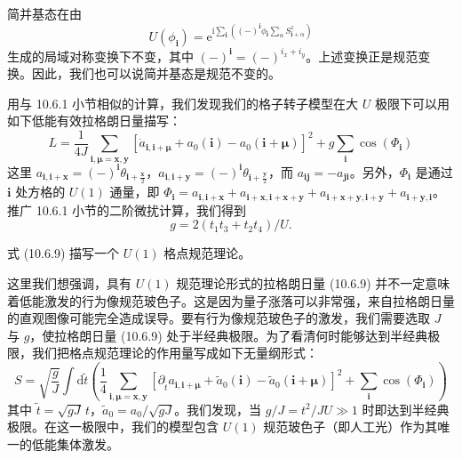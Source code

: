 简并基态在由
\begin{equation*}
U(\phi_{\pmb i})=\mathrm{e}^{\mathrm{i}\sum_{\pmb i}((-)^{\pmb i}\phi_{\pmb i}\sum_{\alpha}S^{z}_{\pmb i+\alpha})}\tag{10.6.8}
\end{equation*}
生成的局域对称变换下不变，其中 $(-)^{\pmb i}=(-)^{i_x+i_y}$。上述变换正是规范变换。因此，我们也可以说简并基态是规范不变的。

用与 10.6.1 小节相似的计算，我们发现我们的格子转子模型在大 $U$ 极限下可以用如下低能有效拉格朗日量描写：
\begin{equation*}
L=\frac{1}{4J}\sum_{\pmb i,\pmb\mu=\pmb x,\pmb y}[\dot{a}_{\pmb i,\pmb i+\pmb\mu}+a_0(\pmb i)-a_0(\pmb i+\pmb\mu)]^{2}+g\sum_{\pmb i}\cos(\Phi_{\pmb i})\tag{10.6.9}
\end{equation*}
这里 $a_{\pmb i,\pmb i+\pmb x}=(-)^{\pmb i}\theta_{\pmb i+\frac{\pmb x}{2}}$，$a_{\pmb i,\pmb i+\pmb y}=(-)^{\pmb i}\theta_{\pmb i+\frac{\pmb y}{2}}$，而 $a_{\pmb i\pmb j}=-a_{\pmb j\pmb i}$。另外，$\Phi_{\pmb i}$ 是通过 $\pmb i$ 处方格的 $U(1)$ 通量，即 $\Phi_{\pmb i}=a_{\pmb i,\pmb i+\pmb x}+a_{\pmb i+\pmb x,\pmb i+\pmb x+\pmb y}+a_{\pmb i+\pmb x+\pmb y,\pmb i+\pmb y}+a_{\pmb i+\pmb y,\pmb i}$。推广 10.6.1 小节的二阶微扰计算，我们得到
\begin{equation*}
g=2(t_1t_3+t_2t_4)/U.
\end{equation*}

式 (10.6.9) 描写一个 $U(1)$ 格点规范理论。

这里我们想强调，具有 $U(1)$ 规范理论形式的拉格朗日量 (10.6.9) 并不一定意味着低能激发的行为像规范玻色子。这是因为量子涨落可以非常强，来自拉格朗日量的直观图像可能完全造成误导。要有行为像规范玻色子的激发，我们需要选取 $J$ 与 $g$，使拉格朗日量 (10.6.9) 处于半经典极限。为了看清何时能够达到半经典极限，我们把格点规范理论的作用量写成如下无量纲形式：
\begin{equation*}
S=\sqrt{\frac{g}{J}}\int\mathrm{d}\tilde t\left(\frac{1}{4}\sum_{\pmb i,\pmb\mu=\pmb x,\pmb y}[\partial_{\tilde t}a_{\pmb i,\pmb i+\pmb\mu}+\tilde a_0(\pmb i)-\tilde a_0(\pmb i+\pmb\mu)]^{2}+\sum_{\pmb i}\cos(\Phi_{\pmb i})\right)
\end{equation*}
其中 $\tilde t=\sqrt{gJ}\,t$，$\tilde a_0=a_0/\sqrt{gJ}$。我们发现，当 $g/J=t^{2}/JU\gg1$ 时即达到半经典极限。在这一极限中，我们的模型包含 $U(1)$ 规范玻色子（即人工光）作为其唯一的低能集体激发。

